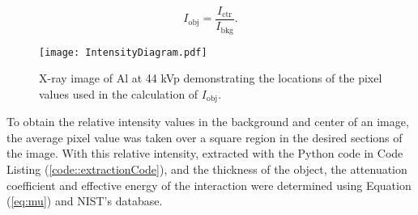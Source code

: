 \begin{equation}
    I_{\text{obj}} = \frac{I_{\text{ctr}}}{I_{\text{bkg}}}.
	\label{eq:IObj}
\end{equation}

\begin{figure}[H]
    \centering
	\texttt{[image: IntensityDiagram.pdf]}
	\caption{X-ray image of Al at 44 kVp demonstrating the locations of the pixel values used in the calculation of $I_{\text{obj}}$.}
	\label{figure:IntensityDiagram}
\end{figure}

To obtain the relative intensity values in the background and center of an image, the average pixel value was taken over a square region in the desired sections of the image. With this relative intensity, extracted with the Python code in Code Listing (\ref{code::extractionCode}), and the thickness of the object, the attenuation coefficient and effective energy of the interaction were determined using Equation (\ref{eq:mu}) and NIST's database.
